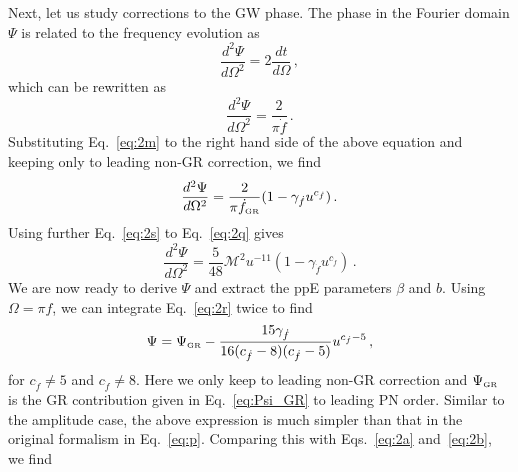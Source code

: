\documentclass[prd,twocolumn,nofootinbib]{revtex4-1}
\newcommand\be{\begin{equation}}
\newcommand\ee{\end{equation}}
\newcommand{\GR}{{\mbox{\tiny GR}}}
\begin{document}
Next, let us study corrections to the GW phase. The phase in the Fourier domain $\Psi$ is related to the frequency evolution as~\cite{Tichy:1999pv}
\begin{equation}
\frac{d^2\Psi}{d \Omega^2}=2\frac{d t}{d\Omega}\,,
\end{equation}
which can be rewritten as
\begin{equation}
\frac{d^2\Psi}{d \Omega^2}=\frac{2}{\pi \dot{f}}\,.
\end{equation}
Substituting Eq.~\eqref{eq:2m} to the right hand side of the above equation and keeping only to leading non-GR correction, we find 
\begin{equation}\label{eq:2q}
\frac{d^2\Psi}{d \Omega^2}=\frac{2}{\pi\dot{f}_{\GR}}(1-\gamma_{\dot{f}}u^{c_{\dot{f}}})\,.
\end{equation}
Using further Eq.~\eqref{eq:2s} to Eq.~\eqref{eq:2q} gives
\begin{equation}\label{eq:2r}
\frac{d^2\Psi}{d \Omega^2}=\frac{5}{48}\mathcal{M}^2u^{-11}(1-\gamma_{\dot{f}}u^{c_{\dot{f}}})\,.
\end{equation}
We are now ready to derive $\Psi$ and extract the ppE parameters $\beta$ and $b$. Using $\Omega = \pi f$, we can integrate Eq.~\eqref{eq:2r} twice to find 
\be
\label{eq:Psi}
\Psi = \Psi_\GR  -\frac{15 \text{$\gamma_{\dot{f}} $}}{16 (\text{$c_{\dot{f}}$}-8) (\text{$c_{\dot{f}}$}-5)} u^{c_{\dot{f}}-5}\,,
\ee
for $c_{\dot{f}} \neq 5$ and $c_{\dot{f}} \neq 8$. Here we only keep to leading non-GR correction and $\Psi_{\GR}$ is the GR contribution given in Eq.~\eqref{eq:Psi_GR} to leading PN order. Similar to the amplitude case, the above expression is much simpler than that in the original formalism in Eq.~\eqref{eq:p}.
Comparing this with Eqs.~\eqref{eq:2a} and~\eqref{eq:2b}, we find
\end{document}
